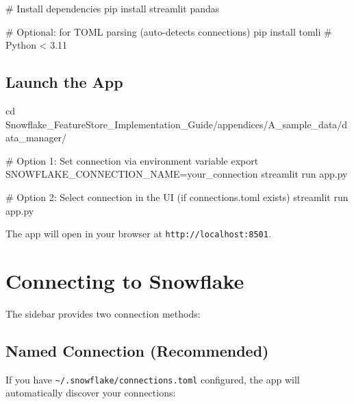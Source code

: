 \documentclass[
  letterpaper,
  DIV=11,
  numbers=noendperiod]{scrreprt}
\newenvironment{Shaded}{\begin{snugshade}}{\end{snugshade}}
\newcommand{\BuiltInTok}[1]{\textcolor[rgb]{0.00,0.23,0.31}{#1}}
\newcommand{\CommentTok}[1]{\textcolor[rgb]{0.37,0.37,0.37}{#1}}
\newcommand{\ExtensionTok}[1]{\textcolor[rgb]{0.00,0.23,0.31}{#1}}
\newcommand{\NormalTok}[1]{\textcolor[rgb]{0.00,0.23,0.31}{#1}}
\newcommand{\OperatorTok}[1]{\textcolor[rgb]{0.37,0.37,0.37}{#1}}
\newcommand{\VariableTok}[1]{\textcolor[rgb]{0.07,0.07,0.07}{#1}}
\begin{document}
\begin{Shaded}
\begin{Highlighting}[]
\CommentTok{\# Install dependencies}
\ExtensionTok{pip}\NormalTok{ install streamlit pandas}

\CommentTok{\# Optional: for TOML parsing (auto{-}detects connections)}
\ExtensionTok{pip}\NormalTok{ install tomli  }\CommentTok{\# Python \textless{} 3.11}
\end{Highlighting}
\end{Shaded}

\hypertarget{launch-the-app}{%
\subsection{Launch the App}\label{launch-the-app}}

\begin{Shaded}
\begin{Highlighting}[]
\BuiltInTok{cd}\NormalTok{ Snowflake\_FeatureStore\_Implementation\_Guide/appendices/A\_sample\_data/data\_manager/}

\CommentTok{\# Option 1: Set connection via environment variable}
\BuiltInTok{export} \VariableTok{SNOWFLAKE\_CONNECTION\_NAME}\OperatorTok{=}\NormalTok{your\_connection}
\ExtensionTok{streamlit}\NormalTok{ run app.py}

\CommentTok{\# Option 2: Select connection in the UI (if connections.toml exists)}
\ExtensionTok{streamlit}\NormalTok{ run app.py}
\end{Highlighting}
\end{Shaded}

The app will open in your browser at \texttt{http://localhost:8501}.

\hypertarget{connecting-to-snowflake}{%
\section{Connecting to Snowflake}\label{connecting-to-snowflake}}

The sidebar provides two connection methods:

\hypertarget{named-connection-recommended}{%
\subsection{Named Connection
(Recommended)}\label{named-connection-recommended}}

If you have \texttt{\textasciitilde{}/.snowflake/connections.toml}
configured, the app will automatically discover your connections:
\end{document}
